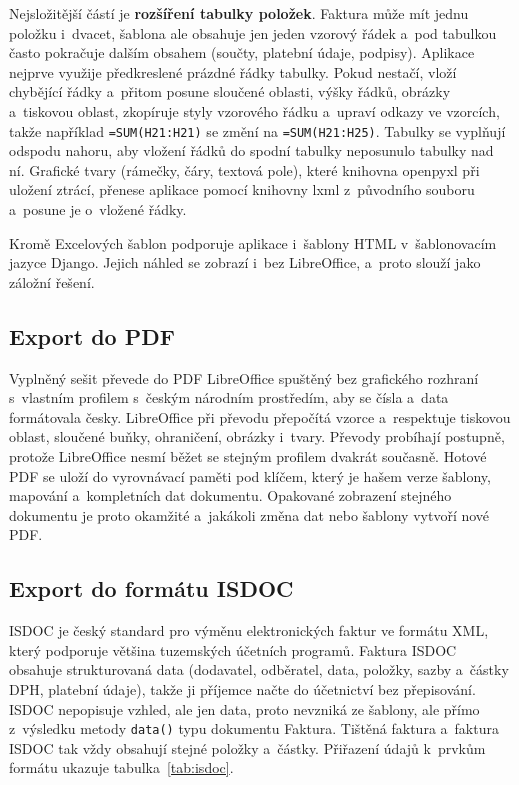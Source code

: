 Nejsložitější částí je \textbf{rozšíření tabulky položek}. Faktura může mít jednu položku i~dvacet, šablona ale obsahuje jen jeden vzorový řádek a~pod tabulkou často pokračuje dalším obsahem (součty, platební údaje, podpisy). Aplikace nejprve využije předkreslené prázdné řádky tabulky. Pokud nestačí, vloží chybějící řádky a~přitom posune sloučené oblasti, výšky řádků, obrázky a~tiskovou oblast, zkopíruje styly vzorového řádku a~upraví odkazy ve vzorcích, takže například \texttt{=SUM(H21:H21)} se změní na \texttt{=SUM(H21:H25)}. Tabulky se vyplňují odspodu nahoru, aby vložení řádků do spodní tabulky neposunulo tabulky nad ní. Grafické tvary (rámečky, čáry, textová pole), které knihovna openpyxl při uložení ztrácí, přenese aplikace pomocí knihovny lxml z~původního souboru a~posune je o~vložené řádky.

Kromě Excelových šablon podporuje aplikace i~šablony HTML v~šablonovacím jazyce Django. Jejich náhled se zobrazí i~bez LibreOffice, a~proto slouží jako záložní řešení.

\subsection{Export do PDF}

Vyplněný sešit převede do PDF LibreOffice spuštěný bez grafického rozhraní s~vlastním profilem s~českým národním prostředím, aby se čísla a~data formátovala česky. LibreOffice při převodu přepočítá vzorce a~respektuje tiskovou oblast, sloučené buňky, ohraničení, obrázky i~tvary. Převody probíhají postupně, protože LibreOffice nesmí běžet se stejným profilem dvakrát současně. Hotové PDF se uloží do vyrovnávací paměti pod klíčem, který je hašem verze šablony, mapování a~kompletních dat dokumentu. Opakované zobrazení stejného dokumentu je proto okamžité a~jakákoli změna dat nebo šablony vytvoří nové PDF.

\subsection{Export do formátu ISDOC}\label{sec:isdoc}

ISDOC je český standard pro výměnu elektronických faktur ve formátu XML, který podporuje většina tuzemských účetních programů. Faktura ISDOC obsahuje strukturovaná data (dodavatel, odběratel, data, položky, sazby a~částky DPH, platební údaje), takže ji příjemce načte do účetnictví bez přepisování. ISDOC nepopisuje vzhled, ale jen data, proto nevzniká ze šablony, ale přímo z~výsledku metody \texttt{data()} typu dokumentu Faktura. Tištěná faktura a~faktura ISDOC tak vždy obsahují stejné položky a~částky. Přiřazení údajů k~prvkům formátu ukazuje tabulka~\ref{tab:isdoc}.

